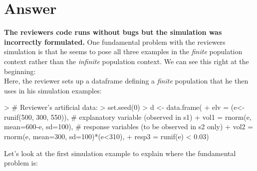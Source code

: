 \documentclass{article}
\begin{document}

\section*{Answer}

\textbf{The reviewers code runs without bugs but the simulation was incorrectly formulated.} One fundamental problem with the reviewers simulation is that he seems to pose all three examples in the \textit{finite} population context rather than the \textit{infinite} population context. We can see this right at the beginning:\\

Here, the reviewer sets up a dataframe defining a \textit{finite} population that he then uses in his simulation examples:

\begin{small}
\begin{Schunk}
\begin{Sinput}
> # Reviewer's artificial data:
> set.seed(0)
> d <- data.frame(
+           elv = (e<-runif(500, 300, 550)),     # explanatory variable (observed in s1)
+           vol1 = rnorm(e, mean=600-e, sd=100), # response variables (to be observed in s2 only)
+           vol2 = rnorm(e, mean=300, sd=100)*(e<310),
+           resp3 = runif(e) < 0.03)
\end{Sinput}
\end{Schunk}
\end{small}

Let's look at the first simulation example to explain where the fundamental problem is:

\begin{small}
\begin{Schunk}
\end{Schunk}
\end{small}
\end{document}
